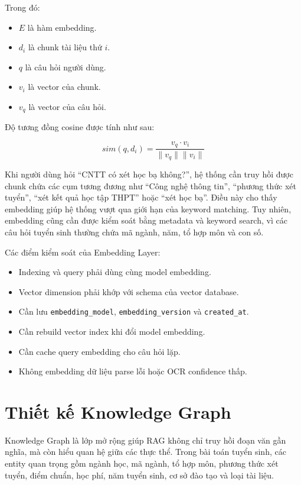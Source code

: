 Trong đó:

\begin{itemize}
    \item $E$ là hàm embedding.
    \item $d_i$ là chunk tài liệu thứ $i$.
    \item $q$ là câu hỏi người dùng.
    \item $v_i$ là vector của chunk.
    \item $v_q$ là vector của câu hỏi.
\end{itemize}

Độ tương đồng cosine được tính như sau:

\begin{equation}
sim(q, d_i) = \frac{v_q \cdot v_i}{\|v_q\| \|v_i\|}
\end{equation}

Khi người dùng hỏi ``CNTT có xét học bạ không?'', hệ thống cần truy hồi được chunk chứa các cụm tương đương như ``Công nghệ thông tin'', ``phương thức xét tuyển'', ``xét kết quả học tập THPT'' hoặc ``xét học bạ''. Điều này cho thấy embedding giúp hệ thống vượt qua giới hạn của keyword matching. Tuy nhiên, embedding cũng cần được kiểm soát bằng metadata và keyword search, vì các câu hỏi tuyển sinh thường chứa mã ngành, năm, tổ hợp môn và con số.

Các điểm kiểm soát của Embedding Layer:

\begin{itemize}
    \item Indexing và query phải dùng cùng model embedding.
    \item Vector dimension phải khớp với schema của vector database.
    \item Cần lưu \texttt{embedding\_model}, \texttt{embedding\_version} và \texttt{created\_at}.
    \item Cần rebuild vector index khi đổi model embedding.
    \item Cần cache query embedding cho câu hỏi lặp.
    \item Không embedding dữ liệu parse lỗi hoặc OCR confidence thấp.
\end{itemize}

\section{Thiết kế Knowledge Graph}

Knowledge Graph là lớp mở rộng giúp RAG không chỉ truy hồi đoạn văn gần nghĩa, mà còn hiểu quan hệ giữa các thực thể. Trong bài toán tuyển sinh, các entity quan trọng gồm ngành học, mã ngành, tổ hợp môn, phương thức xét tuyển, điểm chuẩn, học phí, năm tuyển sinh, cơ sở đào tạo và loại tài liệu.

